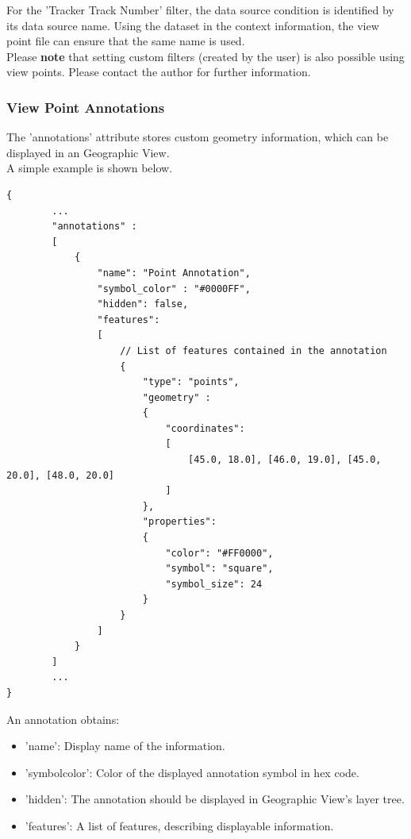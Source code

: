 For the 'Tracker Track Number' filter, the data source condition is identified by its data source name. Using the dataset in the context information, the view point file can ensure that the same name is used. \\

Please \textbf{note} that setting custom filters (created by the user) is also possible using view points. Please contact the author for further information.

\subsubsection{View Point Annotations}

The 'annotations' attribute stores custom geometry information, which can be displayed in an Geographic View. \\

A simple example is shown below.

\begin{lstlisting}[basicstyle=\small\ttfamily]
{
        ...
        "annotations" :
        [
            {
                "name": "Point Annotation", 
                "symbol_color" : "#0000FF",
                "hidden": false,
                "features":
                [
                    // List of features contained in the annotation 
                    {
                        "type": "points",
                        "geometry" :
                        {
                            "coordinates": 
                            [
                                [45.0, 18.0], [46.0, 19.0], [45.0, 20.0], [48.0, 20.0]
                            ]
                        },
                        "properties":
                        {
                            "color": "#FF0000",
                            "symbol": "square",
                            "symbol_size": 24
                        }
                    }    
                ]
            }
        ]
        ...
}
\end{lstlisting}

An annotation obtains: \\

\begin{itemize}
    \item 'name': Display name of the information.
    \item 'symbol\textunderscore color': Color of the displayed annotation symbol in hex code.
    \item 'hidden': The annotation should be displayed in Geographic View's layer tree.
    \item 'features': A list of features, describing displayable information. \\
\end{itemize}

